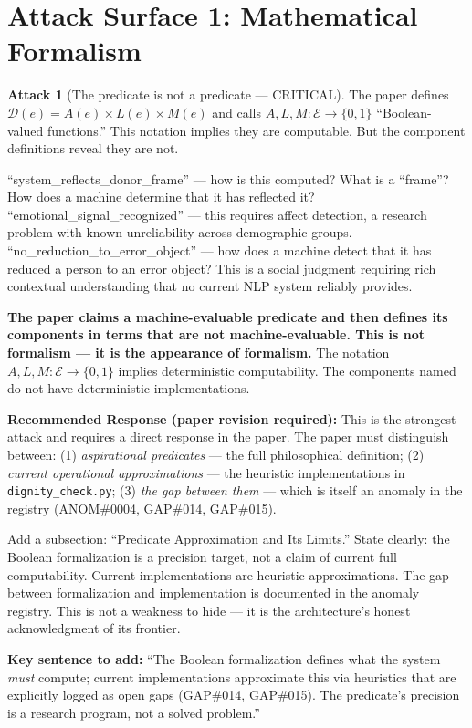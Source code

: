 \documentclass[12pt,a4paper]{article}
\theoremstyle{definition}
\newtheorem{attack}{Attack}[section]
\begin{document}
\section{Attack Surface 1: Mathematical Formalism}

\begin{attack}[The predicate is not a predicate — CRITICAL]
\label{att:notpredicate}
The paper defines $\mathcal{D}(e) = A(e) \times L(e) \times M(e)$ and calls
$A, L, M : \mathcal{E} \to \{0,1\}$ ``Boolean-valued functions.'' This notation
implies they are computable. But the component definitions reveal they are not.

``system\_reflects\_donor\_frame'' — how is this computed? What is a ``frame''?
How does a machine determine that it has reflected it? ``emotional\_signal\_recognized''
— this requires affect detection, a research problem with known unreliability across
demographic groups. ``no\_reduction\_to\_error\_object'' — how does a machine detect
that it has reduced a person to an error object? This is a social judgment requiring
rich contextual understanding that no current NLP system reliably provides.

\textbf{The paper claims a machine-evaluable predicate and then defines its components
in terms that are not machine-evaluable. This is not formalism — it is the appearance
of formalism.} The notation $A, L, M : \mathcal{E} \to \{0,1\}$ implies deterministic
computability. The components named do not have deterministic implementations.
\end{attack}

\begin{mdframed}[style=defenseframe]
\textbf{Recommended Response (paper revision required):}
This is the strongest attack and requires a direct response in the paper.
The paper must distinguish between:
(1) \emph{aspirational predicates} — the full philosophical definition;
(2) \emph{current operational approximations} — the heuristic implementations
in \texttt{dignity\_check.py};
(3) \emph{the gap between them} — which is itself an anomaly in the registry
(ANOM\#0004, GAP\#014, GAP\#015).

Add a subsection: ``Predicate Approximation and Its Limits.'' State clearly: the
Boolean formalization is a precision target, not a claim of current full
computability. Current implementations are heuristic approximations. The gap
between formalization and implementation is documented in the anomaly registry.
This is not a weakness to hide — it is the architecture's honest acknowledgment
of its frontier.

\textbf{Key sentence to add:} ``The Boolean formalization defines what the system
\emph{must} compute; current implementations approximate this via heuristics that
are explicitly logged as open gaps (GAP\#014, GAP\#015). The predicate's precision
is a research program, not a solved problem.''
\end{mdframed}
\end{document}
